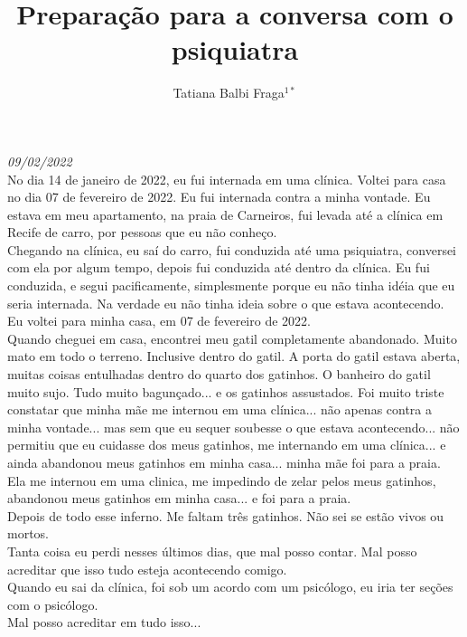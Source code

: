 \documentclass{book}
\title{Preparação para a conversa com o psiquiatra}
\author{Tatiana Balbi Fraga$^{1*}$}
\begin{document}
\emph{09/02/2022}  \\

No dia 14 de janeiro de 2022, eu fui internada em uma clínica. Voltei para casa no dia 07 de fevereiro de 2022. Eu fui internada contra a minha vontade. Eu estava em meu apartamento, na praia de Carneiros, fui levada até a clínica em Recife de carro, por pessoas que eu não conheço. \\

Chegando na clínica, eu saí do carro, fui conduzida até uma psiquiatra, conversei com ela por algum tempo, depois fui conduzida até dentro da clínica. Eu fui conduzida, e segui pacificamente, simplesmente porque eu não tinha idéia que eu seria internada. Na verdade eu não tinha ideia sobre o que estava acontecendo. \\

Eu voltei para minha casa, em 07 de fevereiro de 2022. \\

Quando cheguei em casa, encontrei meu gatil completamente abandonado. Muito mato em todo o terreno. Inclusive dentro do gatil. A porta do gatil estava aberta, muitas coisas entulhadas dentro do quarto dos gatinhos. O banheiro do gatil muito sujo. Tudo muito bagunçado... e os gatinhos assustados. Foi muito triste constatar que minha mãe me internou em uma clínica... não apenas contra a minha vontade... mas sem que eu sequer soubesse o que estava acontecendo... não permitiu que eu cuidasse dos meus gatinhos, me internando em uma clínica... e ainda abandonou meus gatinhos em minha casa... minha mãe foi para a praia. \\

Ela me internou em uma clinica, me impedindo de zelar pelos meus gatinhos, abandonou meus gatinhos em minha casa... e foi para a praia.\\

Depois de todo esse inferno. Me faltam três gatinhos. Não sei se estão vivos ou mortos. \\

Tanta coisa eu perdi nesses últimos dias, que mal posso contar. Mal posso acreditar que isso tudo esteja acontecendo comigo. \\

Quando eu sai da clínica, foi sob um acordo com um psicólogo, eu iria ter seções com o psicólogo.\\

Mal posso acreditar em tudo isso... \\
\end{document}
